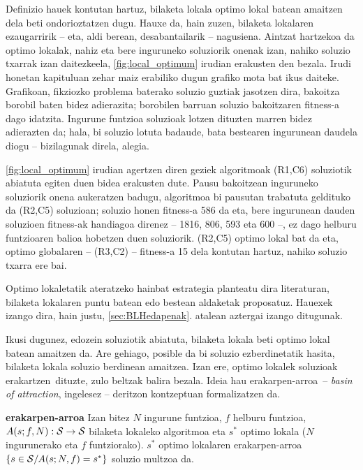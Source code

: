 \documentclass[eu]{ifirak}\usepackage[]{graphicx}\usepackage[]{color}
\newcommand{\zkk}{\guillemotleft}
\newcommand{\skk}{\guillemotright}
\begin{document}
Definizio hauek kontutan hartuz, bilaketa lokala optimo lokal batean amaitzen dela beti ondorioztatzen dugu. Hauxe da, hain zuzen, bilaketa lokalaren ezaugarririk -- eta, aldi berean, desabantailarik -- nagusiena. Aintzat hartzekoa da optimo lokalak, nahiz eta bere inguruneko soluziorik onenak izan, nahiko soluzio txarrak izan daitezkeela, \ref{fig:local_optimum} irudian erakusten den bezala. Irudi honetan kapituluan zehar maiz erabiliko dugun grafiko mota bat ikus daiteke. Grafikoan, fikziozko problema baterako soluzio guztiak jasotzen dira, bakoitza borobil baten bidez adierazita; borobilen barruan soluzio bakoitzaren fitness-a dago idatzita. Ingurune funtzioa soluzioak lotzen dituzten marren bidez adierazten da; hala, bi soluzio lotuta badaude, bata bestearen ingurunean daudela diogu -- bizilagunak direla, alegia. 

\begin{tcolorbox}
\begin{ifexample}
\ref{fig:local_optimum} irudian agertzen diren geziek algoritmoak (R1,C6) soluziotik abiatuta egiten duen bidea erakusten dute. Pausu bakoitzean inguruneko soluziorik onena aukeratzen badugu, algoritmoa bi pausutan trabatuta geldituko da (R2,C5) soluzioan; soluzio honen fitness-a 586 da eta, bere ingurunean dauden soluzioen fitness-ak handiagoa direnez -- 1816, 806, 593 eta 600 --, ez dago helburu funtzioaren balioa hobetzen duen soluziorik. (R2,C5) optimo lokal bat da eta, optimo globalaren -- (R3,C2) -- fitness-a 15 dela kontutan hartuz, nahiko soluzio txarra ere bai.
\end{ifexample}
\end{tcolorbox}

Optimo lokaletatik ateratzeko hainbat estrategia planteatu dira literaturan, bilaketa lokalaren puntu batean edo bestean aldaketak proposatuz. Hauexek izango dira, hain justu, \ref{sec:BLHedapenak}. atalean aztergai izango ditugunak.

Ikusi dugunez, edozein soluziotik abiatuta, bilaketa lokala beti optimo lokal batean amaitzen da. Are gehiago, posible da bi soluzio ezberdinetatik hasita, bilaketa lokala soluzio berdinean amaitzea. Izan ere, optimo lokalek soluzioak \zkk erakartzen\skk\ dituzte, zulo beltzak balira bezala. Ideia hau \zkk erakarpen-arroa\skk\ -- \textit{basin of attraction}, ingelesez -- deritzon kontzeptuan formalizatzen da.

\begin{ifdefinition}{\bf erakarpen-arroa}
Izan bitez $N$ ingurune funtzioa, $f$ helburu funtzioa, $A(s;f,N): {\cal S}\rightarrow {\cal S}$ bilaketa lokaleko algoritmoa eta $s^*$ optimo lokala ($N$ ingurunerako eta $f$ funtziorako). $s^*$ optimo lokalaren erakarpen-arroa $\{s \in {\cal S} / A(s;N,f)=s^*\}$ soluzio multzoa da.
\end{ifdefinition} 
\end{document}
